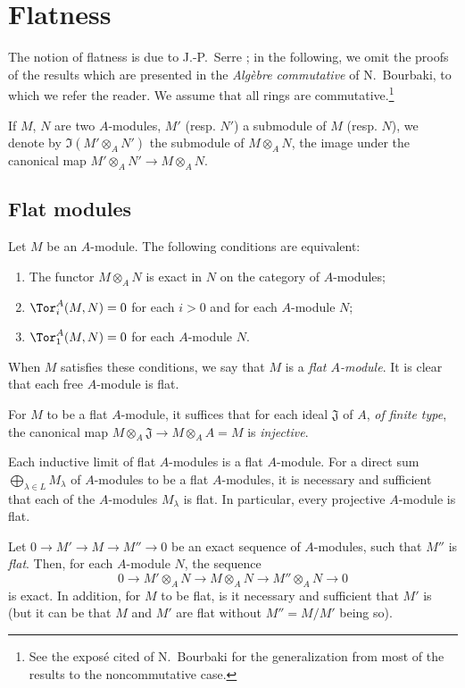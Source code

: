 \section{Flatness}
\label{section:0.6}

\begin{env}[6.0]
\label{0.6.0.0}
The notion of flatness is due to J.-P.~Serre \cite{I-16}; in the following, we omit the
proofs of the results which are presented in the \emph{Alg\`ebre commutative} of N.~Bourbaki,
to which we refer the reader. We assume that all rings are commutative.\footnote{See the
expos\'e cited of N.~Bourbaki for the generalization from most of the results to the
noncommutative case.}

If $M$, $N$ are two $A$-modules, $M'$ (resp. $N'$) a submodule of $M$ (resp. $N$), we denote
by $\Im(M'\otimes_A N')$ the submodule of $M\otimes_A N$, the image under the canonical map
$M'\otimes_A N'\to M\otimes_A N$.
\end{env}

\subsection{Flat modules}
\label{subsection:0.6.1}

\begin{env}[6.1.1]
\label{0.6.1.1}
Let $M$ be an $A$-module. The following conditions are equivalent:
\begin{enumerate}
  \item[(a)] The functor $M\otimes_A N$ is exact in $N$ on the category of $A$-modules;
  \item[(b)] $\Tor_i^A(M,N)=0$ for each $i>0$ and for each $A$-module $N$;
  \item[(c)] $\Tor_1^A(M,N)=0$ for each $A$-module $N$.
\end{enumerate}

When $M$ satisfies these conditions, we say that $M$ is a
\emph{flat $A$-module}. It is clear that each free $A$-module is flat.

For $M$ to be a flat $A$-module, it suffices that for each ideal $\mathfrak{J}$
of $A$, \emph{of finite type}, the canonical map
$M\otimes_A\mathfrak{J}\to M\otimes_A A=M$ is \emph{injective}.
\end{env}

\begin{env}[6.1.2]
\label{0.6.1.2}
Each inductive limit of flat $A$-modules is a flat $A$-module. For a direct sum
$\bigoplus_{\lambda\in L}M_\lambda$ of $A$-modules to be a flat $A$-modules, it
is necessary and sufficient that each of the $A$-modules $M_\lambda$ is flat. In
particular, every projective $A$-module is flat.

Let $0\to M'\to M\to M''\to 0$ be an exact sequence of $A$-modules, such that
$M''$ is \emph{flat}. Then, for each $A$-module $N$, the sequence
\[
  0\to M'\otimes_A N\to M\otimes_A N\to M''\otimes_A N\to 0
\]
is exact.
In addition, for $M$ to be flat, is it necessary and sufficient that $M'$ is (but it can be that $M$ and $M'$ are flat without $M''=M/M'$ being so).
\end{env}

